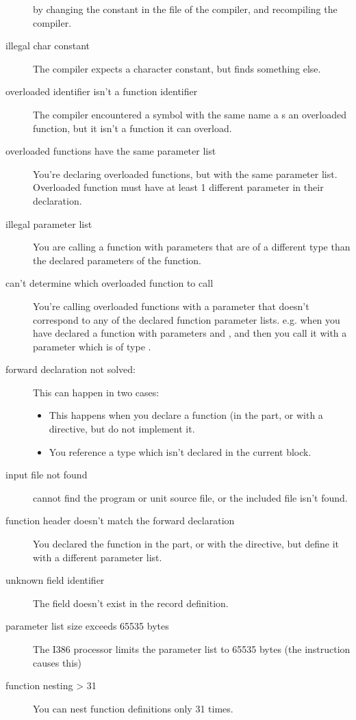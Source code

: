 \documentclass{report}
\begin{document}
\begin{description}
by changing the  constant in the  file of the
compiler, and recompiling the compiler. 
\item [illegal char constant]
The compiler expects a character constant, but finds something else.
\item [overloaded identifier isn't a function identifier]
The compiler encountered a symbol with the same name a s an overloaded
function, but it isn't a function it can overload.
\item [overloaded functions have the same parameter list]
You're declaring overloaded functions, but with the same parameter list.
Overloaded function must have at least 1 different parameter in their
declaration.
\item [illegal parameter list]
You are calling a function with parameters that are of a different type than
the declared parameters of the function.
\item [can't determine which overloaded function to call]
You're calling overloaded functions with a parameter that doesn't correspond
to any of the declared function parameter lists. e.g. when you have declared
a function with parameters  and , and then you call
it with a parameter which is of type .
\item [forward declaration not solved:]
This can happen in two cases:
\begin{itemize}
\item This happens when you declare a function (in the  part, or
with a  directive, but do not implement it.
\item You reference a type which isn't declared in the current 
block.
\end{itemize}
\item [input file not found]
\fpc cannot find the program or unit source file, or the included file isn't
found.
\item [function header doesn't match the forward declaration]
You declared the function in the  part, or with the
 directive, but define it with a different parameter list. 
\item [unknown field identifier]
The field doesn't exist in the record definition.
\item [parameter list size exceeds 65535 bytes]
The I386 processor limits the parameter list to 65535 bytes (the 
instruction causes this)
\item [function nesting > 31]
You can nest function definitions only 31 times. 

\end{description}
\end{document}
